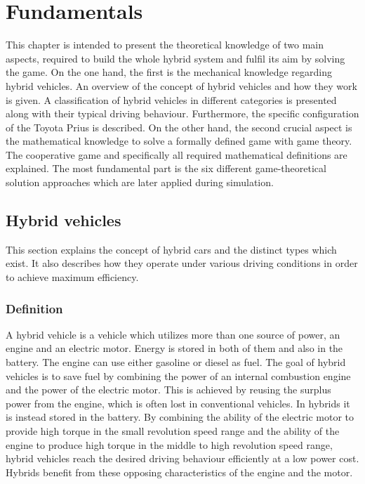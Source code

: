 \chapter{Fundamentals}
\label{chp:fundamentals}
This chapter is intended to present the theoretical knowledge of two main aspects, required to build the whole hybrid system and fulfil its aim by solving the game. On the one hand, the first is the mechanical knowledge regarding hybrid vehicles. An overview of the concept of hybrid vehicles and how they work is given. A classification of hybrid vehicles in different categories is presented along with their typical driving behaviour. Furthermore, the specific configuration of the Toyota Prius is described. On the other hand, the second crucial aspect is the mathematical knowledge to solve a formally defined game with game theory. The cooperative game and specifically all required mathematical definitions are explained. The most fundamental part is the six different game-theoretical solution approaches which are later applied during simulation.

\section{Hybrid vehicles}
This section explains the concept of hybrid cars and the distinct types which exist. It also describes how they operate under various driving conditions in order to achieve maximum efficiency.

\subsection{Definition}
A hybrid vehicle is a vehicle which utilizes more than one source of power, an engine and an electric motor. Energy is stored in both of them and also in the battery. The engine can use either gasoline or diesel as fuel. The goal of hybrid vehicles is to save fuel by combining the power of an internal combustion engine and the power of the electric motor. This is achieved by reusing the surplus power from the engine, which is often lost in conventional vehicles. In hybrids it is instead stored in the battery. By combining the ability of the electric motor to provide high torque in the small revolution speed range and the ability of the engine to produce high torque in the middle to high revolution speed range, hybrid vehicles reach the desired driving behaviour efficiently at a low power cost. Hybrids benefit from these opposing characteristics of the engine and the motor.

